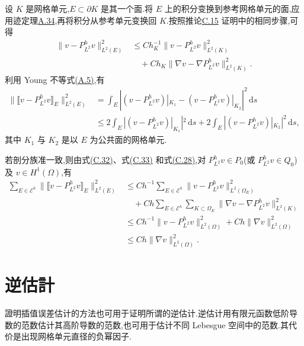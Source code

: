 \begin{note}\label{note:appendix-c-28}
设 $K$ 是网格单元,$E\subset\partial K$ 是其一个面.将 $E$ 上的积分变换到参考网格单元的面,应用迹定理\hyperref[thm:appendix-a-34]{A.34},再将积分从参考单元变换回 $K$.按照推论\hyperref[cor:appendix-c-15]{C.15} 证明中的相同步骤,可得
\begin{equation}\label{eq:appendix-c-32}
\begin{aligned}
 \|v-P^h_{L^2}v\|_{L^2(E)}^2
 &\le Ch_K^{-1}\|v-P^h_{L^2}v\|_{L^2(K)}^2\\
 &\quad+Ch_K\|\nabla v-\nabla P^h_{L^2}v\|_{L^2(K)}^2.
\end{aligned}
\end{equation}
利用 Young 不等式\hyperref[eq:appendix-a-5]{(A.5)},有
\begin{equation}\label{eq:appendix-c-33}
\begin{aligned}
 \|\llbracket v-P^h_{L^2}v\rrbracket_E\|_{L^2(E)}^2
 &=\int_E\left|
    (v-P^h_{L^2}v)|_{K_1}-(v-P^h_{L^2}v)|_{K_2}
   \right|^2\,\mathrm ds\\
 &\le2\int_E|(v-P^h_{L^2}v)|_{K_1}|^2\,\mathrm ds
   +2\int_E|(v-P^h_{L^2}v)|_{K_2}|^2\,\mathrm ds,
\end{aligned}
\end{equation}
其中 $K_1$ 与 $K_2$ 是以 $E$ 为公共面的网格单元.

若剖分族准一致,则由式\hyperref[eq:appendix-c-32]{(C.32)}、式\hyperref[eq:appendix-c-33]{(C.33)} 和式\hyperref[eq:appendix-c-28]{(C.28)},对
$P^h_{L^2}v\in P_0$(或 $P^h_{L^2}v\in Q_0$)及 $v\in H^1(\Omega)$,有
\begin{equation}\label{eq:appendix-c-34}
\begin{aligned}
 \sum_{E\in\mathcal E^h}
  \|\llbracket v-P^h_{L^2}v\rrbracket_E\|_{L^2(E)}^2
 &\le Ch^{-1}\sum_{E\in\mathcal E^h}
       \|v-P^h_{L^2}v\|_{L^2(\Omega_E)}^2\\
 &\quad+Ch\sum_{E\in\mathcal E^h}\sum_{K\subset\Omega_E}
       \|\nabla v-\nabla P^h_{L^2}v\|_{L^2(K)}^2\\
 &\le Ch^{-1}\|v-P^h_{L^2}v\|_{L^2(\Omega)}^2
       +Ch\|\nabla v\|_{L^2(\Omega)}^2\\
 &\le Ch\|\nabla v\|_{L^2(\Omega)}^2.
\end{aligned}
\end{equation}
\end{note}

\section{逆估計}\label{sec:appendix-c-4}

\begin{note}[關於逆估計]\label{note:appendix-c-29}
證明插值误差估计的方法也可用于证明所谓的逆估计.逆估计用有限元函数低阶导数的范数估计其高阶导数的范数,也可用于估计不同 Lebesgue 空间中的范数.其代价是出现网格单元直径的负幂因子.
\end{note}
